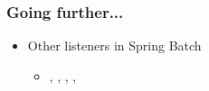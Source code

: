 \begin{frame}
 \frametitle{Going further...}
 \begin{itemize}
  \item Other listeners in Spring Batch
  \begin{itemize}
   \item {}, 
   , , 
   , 
  \end{itemize}
 \end{itemize}
\end{frame}


